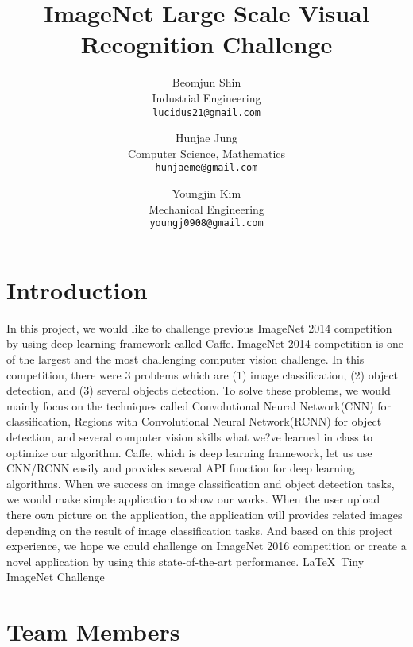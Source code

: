 \documentclass[10pt,twocolumn,letterpaper]{article}
\begin{document}
\title{ImageNet Large Scale Visual Recognition Challenge}

\author{Beomjun Shin\\
Industrial Engineering\\
{\tt\small lucidus21@gmail.com}
\and
Hunjae Jung\\
Computer Science, Mathematics\\
{\tt\small hunjaeme@gmail.com}
\and
Youngjin Kim\\
Mechanical Engineering\\
{\tt\small youngj0908@gmail.com}
}

\maketitle

\section{Introduction}

In this project, we would like to challenge previous ImageNet 2014 competition by using deep learning framework called Caffe.
ImageNet 2014 competition is one of the largest and the most challenging computer vision challenge.
In this competition, there were 3 problems which are (1) image classification, (2) object detection, and (3) several objects detection.
To solve these problems, we would mainly focus on the techniques called Convolutional Neural Network(CNN) for classification, Regions with Convolutional Neural Network(RCNN) for object detection, and several computer vision skills what we?ve learned in class to optimize our algorithm.
Caffe, which is deep learning framework, let us use CNN/RCNN easily and provides several API function for deep learning algorithms.
When we success on image classification and object detection tasks, we would make simple application to show our works.
When the user upload there own picture on the application, the application will provides related images depending on the result of image classification tasks.
And based on this project experience, we hope we could challenge on ImageNet 2016 competition or create a novel application by using this state-of-the-art performance.
\LaTeX\ Tiny ImageNet Challenge

\section{Team Members}
\end{document}
